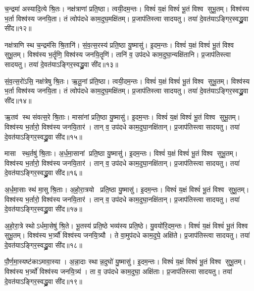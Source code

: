   च॒न्द्रमा॑ अस्यादि॒त्ये श्रि॒तः।
   नक्ष॑त्राणां प्रति॒ष्ठा।
   त्वयी॒दम॒न्तः।
   विश्वं॑ य॒क्षं विश्वं॑ भू॒तं विश्व सुभू॒तम्।
   विश्व॑स्य भ॒र्ता विश्व॑स्य जनयि॒ता।
   तं त्वोप॑दधे काम॒दुघ॒मक्षि॑तम्।
   प्र॒जाप॑तिस्त्वा सादयतु।
   तया॑ दे॒वत॑याऽङ्गिर॒स्वद्ध्रु॒वा सी॑द॥१२॥

   नक्ष॑त्राणि स्थ च॒न्द्रम॑सि श्रि॒तानि॑।
   सं॒व॒त्स॒रस्य॑ प्रति॒ष्ठा यु॒ष्मासु॑। 
   इ॒दम॒न्तः।
   विश्वं॑ य॒क्षं विश्वं॑ भू॒तं विश्व सुभू॒तम्।
   विश्व॑स्य भ॒र्तॄणि॒ विश्व॑स्य जनयि॒तॄणि॑।
   तानि॑ व॒ उप॑दधे काम॒दुघा॒न्यक्षि॑तानि।
   प्र॒जाप॑तिस्त्वा सादयतु।
   तया॑ दे॒वत॑याऽङ्गिर॒स्वद्ध्रु॒वा सी॑द॥१३॥

   सं॒व॒त्स॒रो॑ऽसि॒ नक्ष॑त्रेषु श्रि॒तः।
   ऋ॒तू॒नां प्र॑ति॒ष्ठा। 
   त्वयी॒दम॒न्तः।
   विश्वं॑ य॒क्षं विश्वं॑ भू॒तं विश्व सुभू॒तम्।
   विश्व॑स्य भ॒र्ता विश्व॑स्य जनयि॒ता।
   तं त्वोप॑दधे काम॒दुघ॒मक्षि॑तम्।
   प्र॒जाप॑तिस्त्वा सादयतु।
   तया॑ दे॒वत॑याऽङ्गिर॒स्वद्ध्रु॒वा सी॑द॥१४॥

   ऋ॒तव॑ स्थ संवत्स॒रे श्रि॒ताः।
   मासा॑नां प्रति॒ष्ठा यु॒ष्मासु॑। 
   इ॒दम॒न्तः।
   विश्वं॑ य॒क्षं विश्वं॑ भू॒तं विश्व सुभू॒तम्।
   विश्व॑स्य भ॒र्तारो॒ विश्व॑स्य जनयि॒तार॑।
   तान् व॒ उप॑दधे काम॒दुघा॒नक्षि॑तान्।
   प्र॒जाप॑तिस्त्वा सादयतु।
   तया॑ दे॒वत॑याऽङ्गिर॒स्वद्ध्रु॒वा सी॑द॥१५॥

   मासा स्थ॒र्तषु॑ श्रि॒ताः।
   अ॒र्ध॒मा॒सानां प्रति॒ष्ठा यु॒ष्मासु॑। 
   इ॒दम॒न्तः।
   विश्वं॑ य॒क्षं विश्वं॑ भू॒तं विश्व सुभू॒तम्।
   विश्व॑स्य भ॒र्तारो॒ विश्व॑स्य जनयि॒तार॑।
   तान् व॒ उप॑दधे काम॒दुघा॒नक्षि॑तान्।
   प्र॒जाप॑तिस्त्वा सादयतु।
   तया॑ दे॒वत॑याऽङ्गिर॒स्वद्ध्रु॒वा सी॑द॥१६॥

   अ॒र्ध॒मा॒साः स्थ॑ मा॒सु श्रि॒ताः।
   अ॒हो॒रा॒त्रयो प्रति॒ष्ठा यु॒ष्मासु॑। 
   इ॒दम॒न्तः।
   विश्वं॑ य॒क्षं विश्वं॑ भू॒तं विश्व सुभू॒तम्।
   विश्व॑स्य भ॒र्तारो॒ विश्व॑स्य जनयि॒तार॑।
   तान् व॒ उप॑दधे काम॒दुघा॒नक्षि॑तान्।
   प्र॒जाप॑तिस्त्वा सादयतु।
   तया॑ दे॒वत॑याऽङ्गिर॒स्वद्ध्रु॒वा सी॑द॥१७॥

   अ॒हो॒रा॒त्रे स्थोऽर्धमा॒सेषु॑ श्रि॒ते।
   भू॒तस्य॑ प्रति॒ष्ठे भव्य॑स्य प्रति॒ष्ठे।
   यु॒वयो॑रि॒दम॒न्तः।
   विश्वं॑ य॒क्षं विश्वं॑ भू॒तं विश्व सुभू॒तम्।
   विश्व॑स्य भ॒र्त्र्यौ॑ विश्व॑स्य जनयि॒त्र्यौ।
   ते वा॒मुप॑दधे काम॒दुघे॒ अक्षि॑ते।
   प्र॒जाप॑तिस्त्वा सादयतु।
   तया॑ दे॒वत॑याऽङ्गिर॒स्वद्ध्रु॒वा सी॑द॥१८॥

   पौ॒र्ण॒मा॒स्यष्ट॑काऽमावा॒स्या।
   अ॒न्ना॒दाः स्थान्न॒दुघो॑ यु॒ष्मासु॑। 
   इ॒दम॒न्तः।
   विश्वं॑ य॒क्षं विश्वं॑ भू॒तं विश्व सुभू॒तम्।
   विश्व॑स्य भ॒र्त्र्यो॑ विश्व॑स्य जनयि॒त्र्य॑।
   ता व॒ उप॑दधे काम॒दुघा॒ अक्षि॑ताः।
   प्र॒जाप॑तिस्त्वा सादयतु।
   तया॑ दे॒वत॑याऽङ्गिर॒स्वद्ध्रु॒वा सी॑द॥१९॥

